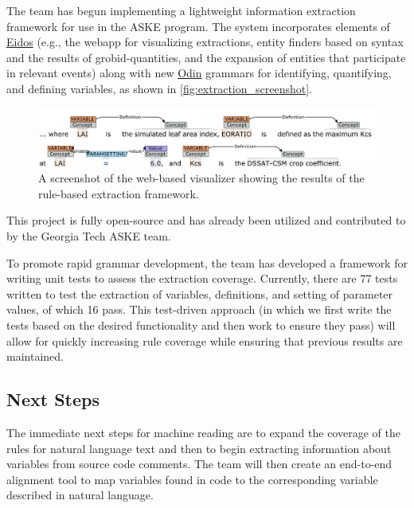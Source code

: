 \documentclass[article, 12pt, oneside]{memoir}
\begin{document}
The team has begun implementing a lightweight
information extraction framework for use in the ASKE program. The system
incorporates elements of \href{https://github.com/clulab/eidos}{Eidos}
(e.g., the webapp for visualizing extractions, entity finders based on
syntax and the results of grobid-quantities, and the expansion of
entities that participate in relevant events) along with new
\href{http://clulab.cs.arizona.edu/papers/lrec2016-odin.pdf}{Odin}
grammars for identifying, quantifying, and defining variables, as shown
in \autoref{fig:extraction_screenshot}.

\begin{figure}[h]
\centering
\includegraphics{figs/extractions.png}
\caption{A screenshot of the web-based visualizer showing the results of
the rule-based extraction framework.}
\label{fig:extraction_screenshot}
\end{figure}

This project is fully open-source and has already been utilized and
contributed to by the Georgia Tech ASKE team.

To promote rapid grammar development, the team has developed a framework
for writing unit tests to assess the extraction coverage. Currently,
there are 77 tests written to test the extraction of variables,
definitions, and setting of parameter values, of which 16 pass. This
test-driven approach (in which we first write the tests based on the
desired functionality and then work to ensure they pass) will allow for
quickly increasing rule coverage while ensuring that previous results
are maintained.

\hypertarget{next-steps}{%
\subsection{Next Steps}\label{next-steps}}

The immediate next steps for machine reading are to expand the coverage
of the rules for natural language text and then to begin extracting
information about variables from source code comments. The team will
then create an end-to-end alignment tool to map variables found in code
to the corresponding variable described in natural language.

\end{document}
